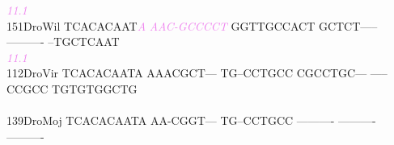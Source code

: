 \documentclass[11pt,twoside,reqno,a4paper]{article}
\begin{document}
{\hspace*{4\charwidth}\hspace*{7\charwidth}\hspace*{9\charwidth}\textit{\textcolor{violet}{11.1}}\hspace*{1\charwidth}\hspace*{1\charwidth}\hspace*{1\charwidth}\hspace*{1\charwidth}\hspace*{1\charwidth}\hspace*{1\charwidth}\\
151\hspace*{1\charwidth}DroWil	TCACACAAT\textit{\textcolor{violet}{A}}	\textit{\textcolor{violet}{A}}\textit{\textcolor{violet}{A}}\textit{\textcolor{violet}{C}}\textit{\textcolor{violet}{-}}\textit{\textcolor{violet}{G}}\textit{\textcolor{violet}{C}}\textit{\textcolor{violet}{C}}\textit{\textcolor{violet}{C}}\textit{\textcolor{violet}{C}}\textit{\textcolor{violet}{T}}	GGTTGCCACT	GCTCT-----	----------	--TGCTCAAT	\\
\hspace*{4\charwidth}\hspace*{7\charwidth}\hspace*{9\charwidth}\textit{\textcolor{violet}{11.1}}\hspace*{1\charwidth}\hspace*{1\charwidth}\hspace*{1\charwidth}\hspace*{1\charwidth}\hspace*{1\charwidth}\hspace*{1\charwidth}\\
112\hspace*{1\charwidth}DroVir	TCACACAATA	AAACGCT---	TG--CCTGCC	CGCCTGC---	-----CCGCC	TGTGTGGCTG	\\
\hspace*{4\charwidth}\hspace*{7\charwidth}\hspace*{1\charwidth}\hspace*{1\charwidth}\hspace*{1\charwidth}\hspace*{1\charwidth}\hspace*{1\charwidth}\hspace*{1\charwidth}\\
139\hspace*{1\charwidth}DroMoj	TCACACAATA	AA-CGGT---	TG--CCTGCC	----------	----------	----------	\\
}
\end{document}
